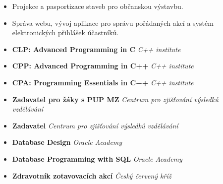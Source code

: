 \documentclass[10pt,a4paper,ragged2e]{altacv}
\begin{document}
\divider

\begin{itemize}
\item Projekce a pasportizace staveb pro občanskou výstavbu.
\end{itemize}

\divider

\begin{itemize}
\item Správa webu, vývoj aplikace pro správu pořádaných akcí a systém elektronických přihlášek účastníků.

\end{itemize}


\smallskip
\begin{itemize}
\item \textbf{CLP: Advanced Programming in C} \textit{C++ institute}
\item \textbf{CPP: Advanced Programming in C++} \textit{C++ institute}
\item \textbf{CPA: Programming Essentials in C++} \textit{C++ institute}
\item \textbf{Zadavatel pro žáky s PUP MZ} \textit{Centrum pro zjišťování výsledků vzdělávání}
\item \textbf{Zadavatel} \textit{Centrum pro zjišťování výsledků vzdělávání}
\item \textbf{Database Design} \textit{Oracle Academy}
\item \textbf{Database Programming with SQL} \textit{Oracle Academy}
\item \textbf{Zdravotník zotavovacích akcí} \textit{Český červený kříž}
\end{itemize}


\clearpage


\nocite{*}






\end{document}
